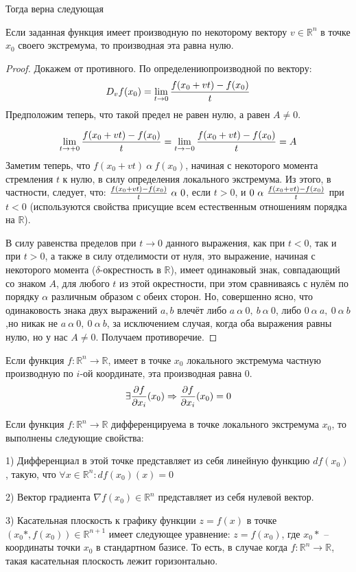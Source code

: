Тогда верна следующая
\begin{theorem}
Если заданная функция имеет производную по некоторому вектору $v \in \mathbb{R}^n$ в точке $x_0$ своего экстремума, то производная эта равна нулю.
\end{theorem}
\begin{proof}


Докажем от противного. 
По определению\linebreak производной по вектору:
$$D_{v}f(x_0) = \lim_{t \to 0}{f(x_0 + vt)-f(x_0) \over t}$$
Предположим теперь, что такой предел не равен нулю, а равен $A \not = 0$.

$$ \lim_{t \to +0}{f(x_0 + vt)-f(x_0) \over t} = \lim_{t \to -0}{f(x_0 + vt)-f(x_0) \over t}=A$$
Заметим теперь, что $f(x_0 +vt)\ \alpha\  f(x_0)$, начиная с некоторого момента стремления $t$ к нулю, в силу определения локального экстремума.
Из этого, в частности, следует, что: ${f(x_0 + vt)-f(x_0) \over t}\ \alpha\ 0$, если $t>0$, и  $0\ \alpha\ {f(x_0 + vt)-f(x_0) \over t}$ при $t<0$ (используются свойства присущие всем естественным отношениям порядка на $\mathbb{R}$).

В силу равенства пределов при $t\to 0$ данного выражения, как при $t<0$, так и при $t>0$, а также в силу отделимости от нуля, это выражение, начиная с некоторого момента ($\delta$-окрестность в $\mathbb{R}$), имеет одинаковый знак, совпадающий со знаком $A$, для любого $t$ из этой окрестности, при этом сравниваясь с нулём по порядку $\alpha$ различным образом с обеих сторон. Но, совершенно ясно, что одинаковость знака двух выражений $a,b$ влечёт либо $a\ \alpha\ 0,\ b\ \alpha\ 0$, либо $0\ \alpha\ a,\ 0\ \alpha\ b$,но никак не $a\ \alpha\ 0,\ 0\ \alpha\ b$, за исключением случая, когда оба выражения равны нулю, но у нас $A \not =0$. Получаем противоречие.
\end{proof}
\begin{consequence}
Если функция $f: \mathbb{R}^n \to \mathbb{R}$, имеет в точке $x_0$ локального экстремума частную производную по $i$-ой координате, эта производная равна 0.$$\exists {\partial f \over \partial x_i}(x_0) \Rightarrow {\partial f \over \partial x_i}(x_0) = 0$$
\end{consequence}
\begin{consequence}
Если функция $f: \mathbb{R}^n \to \mathbb{R}$ дифференцируема в точке  локального экстремума $x_0$, то выполнены следующие свойства: 

1) Дифференциал в этой точке представляет из себя линейную функцию $df(x_0)$, такую, что $\forall x \in \mathbb{R}^n: df(x_0)(x) = 0$ 

2) Вектор градиента $\nabla f(x_0) \in \mathbb{R}^n$ представляет из себя нулевой вектор. 

3) Касательная плоскость к графику функции $z = f(x)$ в точке $(x_0*,f(x_0)) \in \mathbb{R}^{n+1}$ имеет следующее уравнение: $z = f(x_0)$, где $x_0*$ -- координаты точки $x_0$ в стандартном базисе. То есть, в случае когда $f: \mathbb{R}^n \to \mathbb{R}$, такая касательная плоскость лежит горизонтально.
\end{consequence}

